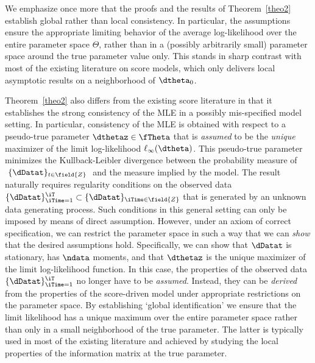 
We emphasize once more that the proofs and the results of Theorem~\ref{theo2} establish global rather than local consistency. In particular, the assumptions ensure the appropriate limiting behavior of the average log-likelihood over the entire parameter space $\Theta$, rather than in a (possibly arbitrarily small) parameter space around the true parameter value only. This stands in sharp contrast with most of the existing literature on score models, which only delivers local asymptotic results on a neighborhood of $\dtheta_{0}$. 

Theorem~\ref{theo2} also differs from the existing score literature in that it establishes the strong consistency of the MLE in a possibly mis-specified model setting. In particular, consistency of the MLE is obtained with respect to a pseudo-true parameter $\dthetaz \in \fTheta$ that
is \textit{assumed} to be the \textit{unique} maximizer of the limit log-likelihood
$\ell_{\infty}(\dtheta)$. This pseudo-true parameter minimizes the
Kullback-Leibler divergence between the probability measure of $ \ \{\dDatat\}_{t \in \field{Z}} \ $
and the measure implied by the model. 
The result naturally requires regularity conditions on the observed data
$\{\dDatat\}_{\iTime=1}^{\iT} \subset \{\dDatat\}_{\iTime \in \field{Z}}$ that is generated by an unknown data generating process.
Such conditions in this general setting can only be imposed by means of direct assumption. 
However, under an axiom of correct specification, we can restrict the parameter space in such a way that we can \textit{show} that the desired assumptions hold. Specifically, we can show that $\dDatat$ is stationary,  has $\ndata$ moments, and  that $\dthetaz$ is the unique maximizer of the limit log-likelihood function. In this case, the properties of the observed data $\{\dDatat\}_{\iTime=1}^{\iT}$ no longer have to be \textit{assumed}. Instead, they can be \textit{derived} from the properties of the score-driven model under appropriate restrictions on the parameter space. 
By establishing `global identification' we ensure that the limit likelihood has a unique maximum over the entire parameter space rather than only in a small neighborhood of the true parameter. The latter 
is typically used in most of the existing literature and achieved by studying the local properties of the information matrix at the true parameter.

